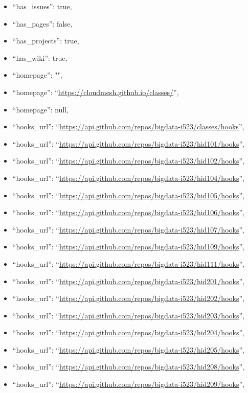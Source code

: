 \begin{itemize}
\item
  ``has\_issues'': true,
\item
  ``has\_pages'': false,
\item
  ``has\_projects'': true,
\item
  ``has\_wiki'': true,
\item
  ``homepage'': "",
\item
  ``homepage'': ``\url{https://cloudmesh.github.io/classes/}'',
\item
  ``homepage'': null,
\item
  ``hooks\_url'':
  ``\url{https://api.github.com/repos/bigdata-i523/classes/hooks}'',
\item
  ``hooks\_url'':
  ``\url{https://api.github.com/repos/bigdata-i523/hid101/hooks}'',
\item
  ``hooks\_url'':
  ``\url{https://api.github.com/repos/bigdata-i523/hid102/hooks}'',
\item
  ``hooks\_url'':
  ``\url{https://api.github.com/repos/bigdata-i523/hid104/hooks}'',
\item
  ``hooks\_url'':
  ``\url{https://api.github.com/repos/bigdata-i523/hid105/hooks}'',
\item
  ``hooks\_url'':
  ``\url{https://api.github.com/repos/bigdata-i523/hid106/hooks}'',
\item
  ``hooks\_url'':
  ``\url{https://api.github.com/repos/bigdata-i523/hid107/hooks}'',
\item
  ``hooks\_url'':
  ``\url{https://api.github.com/repos/bigdata-i523/hid109/hooks}'',
\item
  ``hooks\_url'':
  ``\url{https://api.github.com/repos/bigdata-i523/hid111/hooks}'',
\item
  ``hooks\_url'':
  ``\url{https://api.github.com/repos/bigdata-i523/hid201/hooks}'',
\item
  ``hooks\_url'':
  ``\url{https://api.github.com/repos/bigdata-i523/hid202/hooks}'',
\item
  ``hooks\_url'':
  ``\url{https://api.github.com/repos/bigdata-i523/hid203/hooks}'',
\item
  ``hooks\_url'':
  ``\url{https://api.github.com/repos/bigdata-i523/hid204/hooks}'',
\item
  ``hooks\_url'':
  ``\url{https://api.github.com/repos/bigdata-i523/hid205/hooks}'',
\item
  ``hooks\_url'':
  ``\url{https://api.github.com/repos/bigdata-i523/hid208/hooks}'',
\item
  ``hooks\_url'':
  ``\url{https://api.github.com/repos/bigdata-i523/hid209/hooks}'',

\end{itemize}
